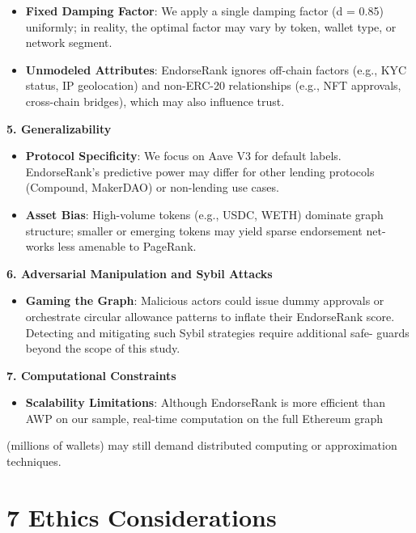 \documentclass[12pt]{article}
\newcommand{\proposalSubheading}[1]{%
  \par\addvspace{0.38\baselineskip}%
  \noindent\textbf{#1}\par\nobreak\addvspace{0.08\baselineskip}%
}
\begin{document}
\begin{itemize}
\item[\textbullet] \textbf{Fixed Damping Factor}: We apply a single damping factor (d = 0.85) uniformly; in reality, the optimal factor may vary by token, wallet type, or network segment.
\item[\textbullet] \textbf{Unmodeled Attributes}: EndorseRank ignores off-chain factors (e.g., KYC status, IP geolocation) and non-ERC-20 relationships (e.g., NFT approvals, cross-chain bridges), which may also influence trust.
\end{itemize}
\proposalSubheading{5. Generalizability}

\begin{itemize}
\item[\textbullet] \textbf{Protocol Specificity}: We focus on Aave V3 for default labels. EndorseRank's predictive power may differ for other lending protocols (Compound, MakerDAO) or non-lending use cases.
\item[\textbullet] \textbf{Asset Bias}: High-volume tokens (e.g., USDC, WETH) dominate graph structure; smaller or emerging tokens may yield sparse endorsement net- works less amenable to PageRank.
\end{itemize}
\proposalSubheading{6. Adversarial Manipulation and Sybil Attacks}

\begin{itemize}
\item[\textbullet] \textbf{Gaming the Graph}: Malicious actors could issue dummy approvals or orchestrate circular allowance patterns to inflate their EndorseRank score. Detecting and mitigating such Sybil strategies require additional safe- guards beyond the scope of this study.
\end{itemize}
\proposalSubheading{7. Computational Constraints}

\begin{itemize}
\item[\textbullet] \textbf{Scalability Limitations}: Although EndorseRank is more efficient than AWP on our sample, real-time computation on the full Ethereum graph
\end{itemize}
(millions of wallets) may still demand distributed computing or approximation techniques.


\clearpage
{}
\section*{7 \textbf{Ethics Considerations}}
\label{sec:ethics-considerations}
\end{document}
